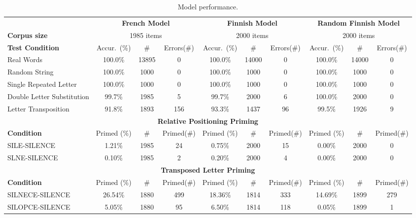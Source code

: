 \begin{table}[htbp]
\centering
\caption{Model performance.}
\label{tab:performance}
\begin{tabular}{|l|ccc|ccc|ccc|}
\hline
 & \multicolumn{3}{c|}{\textbf{French Model}} & \multicolumn{3}{c|}{\textbf{Finnish Model}} & \multicolumn{3}{c|}{\textbf{Random Finnish Model}} \\
\textbf{Corpus size} & \multicolumn{3}{c|}{1985 items} & \multicolumn{3}{c|}{2000 items} & \multicolumn{3}{c|}{2000 items} \\
\hline
\textbf{Test Condition} & Accur.\ (\%) & \# & Errors(\#) & Accur.\ (\%) & \# & Errors(\#) & Accur.\ (\%) & \# & Errors(\#) \\
\hline
Real Words & 100.0\% & 13895 & 0 & 100.0\% & 14000 & 0 & 100.0\% & 14000 & 0 \\
Random String & 100.0\% & 1000 & 0 & 100.0\% & 1000 & 0 & 100.0\% & 1000 & 0 \\
Single Repeated Letter & 100.0\% & 1000 & 0 & 100.0\% & 1000 & 0 & 100.0\% & 1000 & 0 \\
Double Letter Substitution & 99.7\% & 1985 & 5 & 99.7\% & 2000 & 6 & 100.0\% & 2000 & 0 \\
Letter Transposition & 91.8\% & 1893 & 156 & 93.3\% & 1437 & 96 & 99.5\% & 1926 & 9 \\
\hline
\multicolumn{10}{|c|}{\textbf{Relative Positioning Priming}} \\
\hline
\textbf{Condition} & Primed (\%) & \# & Primed(\#) & Primed (\%) & \# & Primed(\#) & Primed (\%) & \# & Primed(\#) \\
\hline
SILE-SILENCE & 1.21\% & 1985 & 24 & 0.75\% & 2000 & 15 & 0.00\% & 2000 & 0 \\
SLNE-SILENCE & 0.10\% & 1985 & 2 & 0.20\% & 2000 & 4 & 0.00\% & 2000 & 0 \\
\hline
\multicolumn{10}{|c|}{\textbf{Transposed Letter Priming}} \\
\hline
\textbf{Condition} & Primed (\%) & \# & Primed(\#) & Primed (\%) & \# & Primed(\#) & Primed (\%) & \# & Primed(\#) \\
\hline
SILNECE-SILENCE & 26.54\% & 1880 & 499 & 18.36\% & 1814 & 333 & 14.69\% & 1899 & 279 \\
SILOPCE-SILENCE & 5.05\% & 1880 & 95 & 6.50\% & 1814 & 118 & 0.05\% & 1899 & 1 \\
\hline
\end{tabular}


\end{table}
